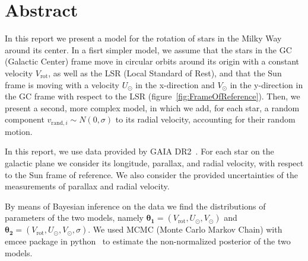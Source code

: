 \section*{Abstract}

In this report we present a model for the rotation of stars in the Milky Way around its center.
In a fisrt simpler model, we assume that the stars in the GC (Galactic Center) frame move in circular orbits around its origin with a constant velocity $V_{\text{rot}}$, as well as the LSR (Local Standard of Rest), and that the Sun frame is moving with a velocity $U_{\odot}$ in the x-direction and $V_{\odot}$ in the y-direction in the GC frame with respect to the LSR (figure~\ref{fig:FrameOfReference}). Then, we present a second, more complex model, in which we add, for each star, a random component $v_{\text{rand}, i} \sim N(0, \sigma)$ to its radial velocity, accounting for their random motion.



In this report, we use data provided by GAIA DR2~\cite{GAIADR2}.
For each star on the galactic plane we consider its longitude, parallax, and radial velocity, with respect to the Sun frame of reference.
We also consider the provided uncertainties of the measurements of parallax and radial velocity.

By means of Bayesian inference on the data we find the distributions of parameters of the two models, namely $\mathbf{\theta_1} = (V_{\text{rot}}, U_{\odot}, V_{\odot})$ and $\mathbf{\theta_2} = (V_{\text{rot}}, U_{\odot}, V_{\odot}, \sigma)$.
We used MCMC (Monte Carlo Markov Chain) with emcee package in python~\cite{EMCEE} to estimate the non-normalized posterior of the two models. 

